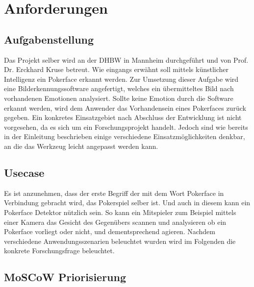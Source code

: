 \documentclass[12pt, a4paper]{scrbook}
\begin{document}
\chapter{Anforderungen}


\section{Aufgabenstellung}

 Das Projekt selber wird an der DHBW in Mannheim durchgeführt und von Prof. Dr. Erckhard Kruse betreut.
 Wie eingangs erwähnt soll mittels künstlicher Intelligenz ein Pokerface erkannt werden. 
Zur Umsetzung dieser Aufgabe wird eine Bilderkennungssoftware angefertigt, welches ein übermitteltes Bild nach vorhandenen Emotionen analysiert. Sollte keine Emotion durch die Software erkannt werden, wird dem Anwender das Vorhandensein eines Pokerfaces zurück gegeben. Ein konkretes Einsatzgebiet nach Abschluss der Entwicklung ist nicht
vorgesehen, da es sich um ein Forschungsprojekt handelt. Jedoch sind wie bereits in der Einleitung beschrieben einige verschiedene Einsatzmöglichkeiten denkbar, an die das Werkzeug leicht angepasst werden kann.



\section{Usecase}

Es ist anzunehmen, dass der erste Begriff der mit dem Wort Pokerface in Verbindung gebracht wird, das Pokerspiel selber ist. Und auch in diesem kann ein Pokerface Detektor nützlich sein. So kann
ein Mitspieler zum Beispiel mittels einer Kamera das Gesicht des Gegenübers scannen und analysieren ob ein Pokerface vorliegt oder nicht, und dementsprechend agieren.
Nachdem verschiedene Anwendungsszenarien beleuchtet wurden wird im Folgenden die konkrete Forschungsfrage beleuchtet.


\section{MoSCoW Priorisierung}
\end{document}

